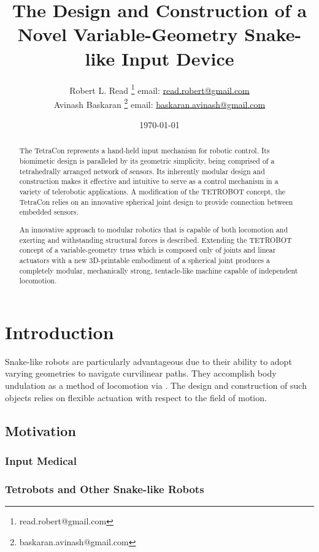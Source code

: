 \documentclass[11pt]{article}
\title{The Design and Construction of a Novel Variable-Geometry Snake-like Input Device}
\author{Robert L. Read
  \thanks{read.robert@gmail.com}
  email: \href{mailto:read.robert@gmail.com}{read.robert@gmail.com}\\
Avinash Baskaran
  \thanks{baskaran.avinash@gmail.com}
  email: \href{mailto:Baskaran.avinash@gmail.com}{baskaran.avinash@gmail.com}
  }
\affil{Public Invention, an educational non-profit.}
\date{\today}
\begin{document}
\maketitle


\begin{abstract}

  The TetraCon represents a hand-held input mechanism for robotic control. Its biomimetic design is paralleled by its geometric simplicity, being comprised of a tetrahedrally arranged network of sensors. Its inherently modular design and construction makes it effective and intuitive to serve as a control mechanism in a variety of telerobotic applications. A modification of the TETROBOT\cite{sanderson1996modular,lee2002dynamic,lee1999dynamics,TetrobotBook} concept, the TetraCon relies on an innovative spherical joint design\cite{song2003spherical} to provide connection between embedded sensors.   
 

  An innovative approach to modular robotics that is capable of both locomotion and exerting and
  withstanding structural forces is described.
  Extending the TETROBOT\cite{sanderson1996modular,lee2002dynamic,lee1999dynamics,TetrobotBook}
  concept of a variable-geometry
  truss which is composed only of joints and linear actuators
  with a new 3D-printable embodiment of a
  spherical joint\cite{song2003spherical}
  produces a completely modular, mechanically strong, tentacle-like machine capable of independent locomotion.
\end{abstract}


\section{Introduction}
Snake-like robots are particularly advantageous due to their ability to adopt varying geometries to navigate curvilinear paths.  They accomplish body undulation as a method of locomotion via . The design and construction of such objects relies on flexible actuation with respect to the field of motion. 


\subsection{Motivation}

\subsubsection{Input Medical}
\subsubsection{Tetrobots and Other Snake-like Robots}
\end{document}
